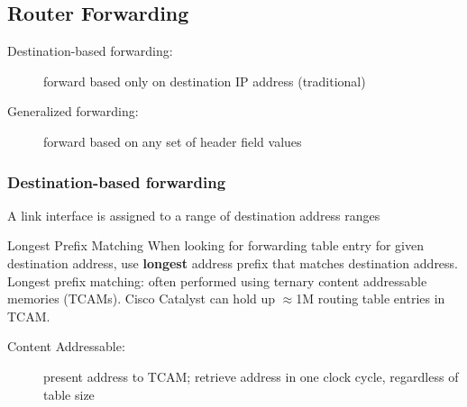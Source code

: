 \subsection{Router Forwarding}
\begin{description}
	\item[Destination-based forwarding:] forward based only on destination IP address (traditional)
	\item[Generalized forwarding:] forward based on any set of header field values
\end{description}
\subsubsection{Destination-based forwarding}
A link interface is assigned to a range of destination address ranges\\
\begin{note}{Longest Prefix Matching}
	When looking for forwarding table entry for given destination address, use \textbf{longest} address prefix that matches destination address. Longest prefix matching: often performed using ternary content addressable memories (TCAMs). Cisco Catalyst can hold up $\approx$1M routing table entries in TCAM.
\end{note}
\begin{description}
	\item[Content Addressable:] present address to TCAM; retrieve address in one clock cycle, regardless of table size
\end{description}
